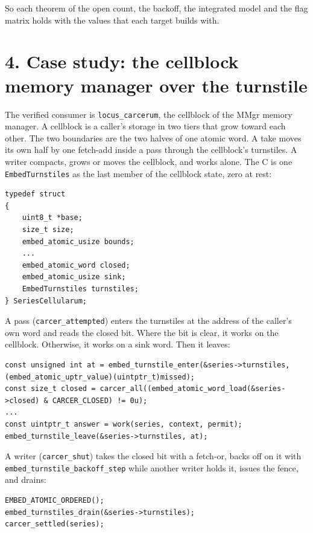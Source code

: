 So each theorem of the open count, the backoff, the integrated model and the flag matrix holds with the values that each target builds with.

\section{\texorpdfstring{4. Case study: the cellblock memory manager over the turnstile}{4. Case study: the cellblock memory manager over the turnstile}}

The verified consumer is \texttt{locus\_\allowbreak{}carcerum}, the cellblock of the MMgr memory manager. A cellblock is a caller's storage in two tiers that grow toward each other. The two boundaries are the two halves of one atomic word. A take moves its own half by one fetch-add inside a pass through the cellblock's turnstiles. A writer compacts, grows or moves the cellblock, and works alone. The C is one \texttt{Embed\allowbreak{}Turnstiles} as the last member of the cellblock state, zero at rest:

\begin{Verbatim}
typedef struct
{
    uint8_t *base;
    size_t size;
    embed_atomic_usize bounds;
    ...
    embed_atomic_word closed;
    embed_atomic_usize sink;
    EmbedTurnstiles turnstiles;
} SeriesCellularum;
\end{Verbatim}

A pass (\texttt{carcer\_\allowbreak{}attempted}) enters the turnstiles at the address of the caller's own word and reads the closed bit. Where the bit is clear, it works on the cellblock. Otherwise, it works on a sink word. Then it leaves:

\begin{Verbatim}
const unsigned int at = embed_turnstile_enter(&series->turnstiles, (embed_atomic_uptr_value)(uintptr_t)missed);
const size_t closed = carcer_all((embed_atomic_word_load(&series->closed) & CARCER_CLOSED) != 0u);
...
const uintptr_t answer = work(series, context, permit);
embed_turnstile_leave(&series->turnstiles, at);
\end{Verbatim}

A writer (\texttt{carcer\_\allowbreak{}shut}) takes the closed bit with a fetch-or, backs off on it with \texttt{embed\_\allowbreak{}turnstile\_\allowbreak{}backoff\_\allowbreak{}step} while another writer holds it, issues the fence, and drains:

\begin{Verbatim}
EMBED_ATOMIC_ORDERED();
embed_turnstiles_drain(&series->turnstiles);
carcer_settled(series);
\end{Verbatim}

